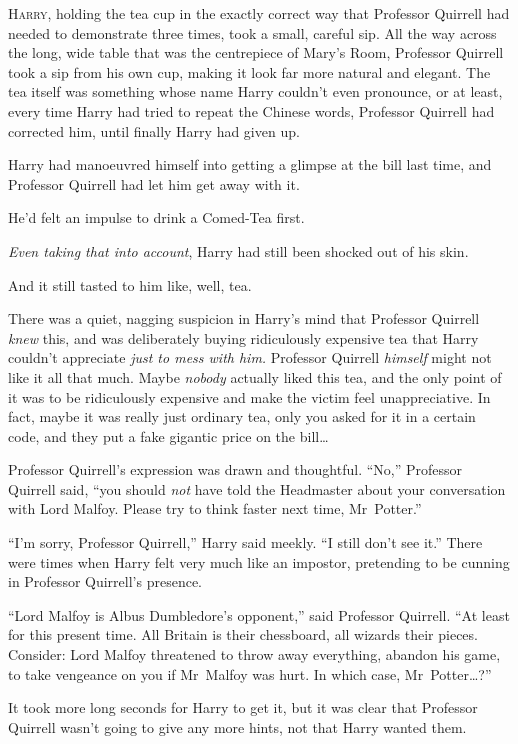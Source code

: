 
\lettrine{H}{arry}, holding the tea cup in the exactly correct way that Professor Quirrell had needed to demonstrate three times, took a small, careful sip. All the way across the long, wide table that was the centrepiece of Mary’s Room, Professor Quirrell took a sip from his own cup, making it look far more natural and elegant. The tea itself was something whose name Harry couldn’t even pronounce, or at least, every time Harry had tried to repeat the Chinese words, Professor Quirrell had corrected him, until finally Harry had given up.

Harry had manoeuvred himself into getting a glimpse at the bill last time, and Professor Quirrell had let him get away with it.

He’d felt an impulse to drink a Comed-Tea first.

\emph{Even taking that into account}, Harry had still been shocked out of his skin.

And it still tasted to him like, well, tea.

There was a quiet, nagging suspicion in Harry’s mind that Professor Quirrell \emph{knew} this, and was deliberately buying ridiculously expensive tea that Harry couldn’t appreciate \emph{just to mess with him.} Professor Quirrell \emph{himself} might not like it all that much. Maybe \emph{nobody} actually liked this tea, and the only point of it was to be ridiculously expensive and make the victim feel unappreciative. In fact, maybe it was really just ordinary tea, only you asked for it in a certain code, and they put a fake gigantic price on the bill…

Professor Quirrell’s expression was drawn and thoughtful. “No,” Professor Quirrell said, “you should \emph{not} have told the Headmaster about your conversation with Lord Malfoy. Please try to think faster next time, Mr~Potter.”

“I’m sorry, Professor Quirrell,” Harry said meekly. “I still don’t see it.” There were times when Harry felt very much like an impostor, pretending to be cunning in Professor Quirrell’s presence.

“Lord Malfoy is Albus Dumbledore’s opponent,” said Professor Quirrell. “At least for this present time. All Britain is their chessboard, all wizards their pieces. Consider: Lord Malfoy threatened to throw away everything, abandon his game, to take vengeance on you if Mr~Malfoy was hurt. In which case, Mr~Potter…?”

It took more long seconds for Harry to get it, but it was clear that Professor Quirrell wasn’t going to give any more hints, not that Harry wanted them.

